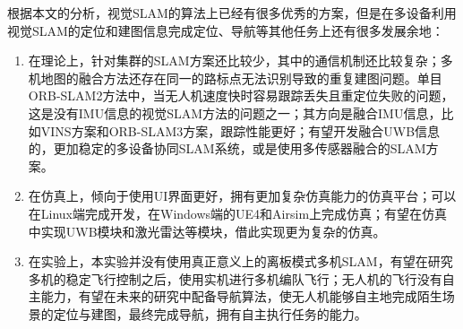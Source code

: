 根据本文的分析，视觉SLAM的算法上已经有很多优秀的方案，但是在多设备利用视觉SLAM的定位和建图信息完成定位、导航等其他任务上还有很多发展余地：

\begin{enumerate}
	\item
	在理论上，针对集群的SLAM方案还比较少，其中的通信机制还比较复杂；多机地图的融合方法还存在同一的路标点无法识别导致的重复建图问题。单目ORB-SLAM2方法中，当无人机速度快时容易跟踪丢失且重定位失败的问题，这是没有IMU信息的视觉SLAM方法的问题之一；其方向是融合IMU信息，比如VINS方案和ORB-SLAM3方案，跟踪性能更好；有望开发融合UWB信息的，更加稳定的多设备协同SLAM系统，或是使用多传感器融合的SLAM方案。
	\item 
	在仿真上，倾向于使用UI界面更好，拥有更加复杂仿真能力的仿真平台；可以在Linux端完成开发，在Windows端的UE4和Airsim上完成仿真；有望在仿真中实现UWB模块和激光雷达等模块，借此实现更为复杂的仿真。
	\item 
	在实验上，本实验并没有使用真正意义上的离板模式多机SLAM，有望在研究多机的稳定飞行控制之后，使用实机进行多机编队飞行；无人机的飞行没有自主能力，有望在未来的研究中配备导航算法，使无人机能够自主地完成陌生场景的定位与建图，最终完成导航，拥有自主执行任务的能力。
	
\end{enumerate}

